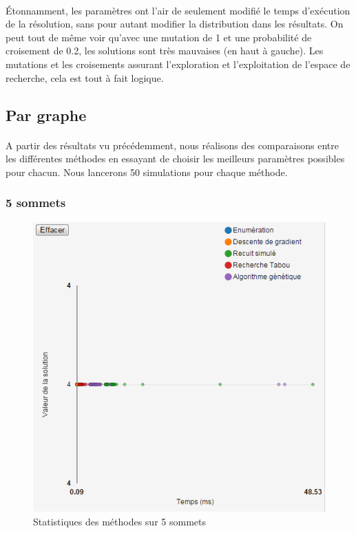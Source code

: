 \documentclass[12pt]{article}
\begin{document}
\paragraph{}Étonnamment, les paramètres ont l'air de seulement modifié le temps d'exécution de la résolution, sans pour autant modifier la distribution dans les résultats. On peut tout de même voir qu'avec une mutation de 1 et une probabilité de croisement de 0.2, les solutions sont très mauvaises (en haut à gauche). Les mutations et les croisements assurant l'exploration et l'exploitation de l'espace de recherche, cela est tout à fait logique.

\subsection{Par graphe}

\paragraph{}A partir des résultats vu précédemment, nous réalisons des comparaisons entre les différentes méthodes en essayant de choisir les meilleurs paramètres possibles pour chacun. Nous lancerons 50 simulations pour chaque méthode.

\subsubsection{5 sommets}

\begin{figure}[H]
	\begin{center}
	\includegraphics[scale=0.5]{pictures/results/5sommets.png}
	\end{center}
	\caption{Statistiques des méthodes sur 5 sommets \label{fig:5nodeResult}}
\end{figure}
\end{document}
